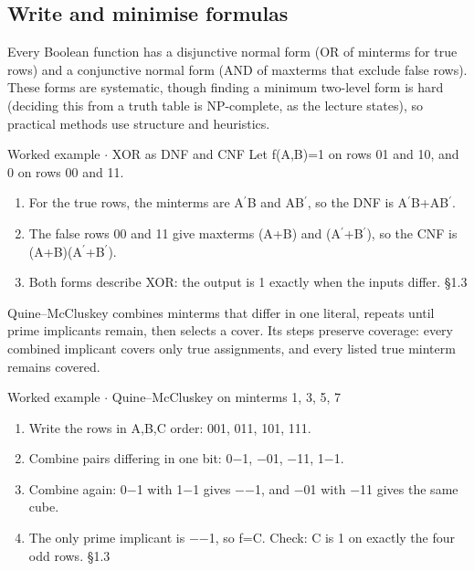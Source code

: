 \documentclass[11pt]{article}
\begin{document}
\begin{keepsection}
\begin{keepsection}
\subsection{Write and minimise formulas}

Every Boolean function has a disjunctive normal form (OR of minterms for true rows) and a conjunctive normal form (AND of maxterms that exclude false rows). These forms are systematic, though finding a minimum two-level form is hard (deciding this from a truth table is NP-complete, as the lecture states), so practical methods use structure and heuristics.

\begin{workedbox}{Worked example \ensuremath{\cdot} XOR as DNF and CNF}
Let f(A,B)=1 on rows 01 and 10, and 0 on rows 00 and 11.

\begin{enumerate}
\item For the true rows, the minterms are A\ensuremath{{}^{\prime}}B and AB\ensuremath{{}^{\prime}}, so the DNF is A\ensuremath{{}^{\prime}}B+AB\ensuremath{{}^{\prime}}.
\item The false rows 00 and 11 give maxterms (A+B) and (A\ensuremath{{}^{\prime}}+B\ensuremath{{}^{\prime}}), so the CNF is (A+B)(A\ensuremath{{}^{\prime}}+B\ensuremath{{}^{\prime}}).
\item Both forms describe XOR: the output is 1 exactly when the inputs differ. \hfill{\small\color{FAUblue}§1.3}
\end{enumerate}
\end{workedbox}

Quine–McCluskey combines minterms that differ in one literal, repeats until prime implicants remain, then selects a cover. Its steps preserve coverage: every combined implicant covers only true assignments, and every listed true minterm remains covered.

\begin{workedbox}{Worked example \ensuremath{\cdot} Quine–McCluskey on minterms 1, 3, 5, 7}
\begin{enumerate}
\item Write the rows in A,B,C order: 001, 011, 101, 111.
\item Combine pairs differing in one bit: 0\ensuremath{-}1, \ensuremath{-}01, \ensuremath{-}11, 1\ensuremath{-}1.
\item Combine again: 0\ensuremath{-}1 with 1\ensuremath{-}1 gives \ensuremath{-}\ensuremath{-}1, and \ensuremath{-}01 with \ensuremath{-}11 gives the same cube.
\item The only prime implicant is \ensuremath{-}\ensuremath{-}1, so f=C. Check: C is 1 on exactly the four odd rows. \hfill{\small\color{FAUblue}§1.3}
\end{enumerate}
\end{workedbox}


\end{keepsection}
\end{keepsection}
\end{document}
